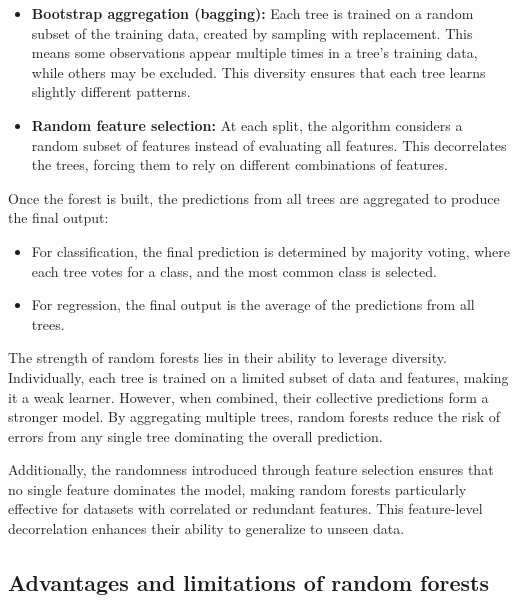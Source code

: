 \documentclass[
]{book}
\providecommand{\tightlist}{%
  \setlength{\itemsep}{0pt}\setlength{\parskip}{0pt}}
\theoremstyle{definition}
\theoremstyle{definition}
\theoremstyle{definition}
\theoremstyle{definition}
\theoremstyle{remark}
\begin{document}
\begin{itemize}
\tightlist
\item
  \textbf{Bootstrap aggregation (bagging):} Each tree is trained on a random subset of the training data, created by sampling with replacement. This means some observations appear multiple times in a tree's training data, while others may be excluded. This diversity ensures that each tree learns slightly different patterns.\\
\item
  \textbf{Random feature selection:} At each split, the algorithm considers a random subset of features instead of evaluating all features. This decorrelates the trees, forcing them to rely on different combinations of features.
\end{itemize}

Once the forest is built, the predictions from all trees are aggregated to produce the final output:

\begin{itemize}
\tightlist
\item
  For classification, the final prediction is determined by majority voting, where each tree votes for a class, and the most common class is selected.\\
\item
  For regression, the final output is the average of the predictions from all trees.
\end{itemize}

The strength of random forests lies in their ability to leverage diversity. Individually, each tree is trained on a limited subset of data and features, making it a weak learner. However, when combined, their collective predictions form a stronger model. By aggregating multiple trees, random forests reduce the risk of errors from any single tree dominating the overall prediction.

Additionally, the randomness introduced through feature selection ensures that no single feature dominates the model, making random forests particularly effective for datasets with correlated or redundant features. This feature-level decorrelation enhances their ability to generalize to unseen data.

\subsection*{Advantages and limitations of random forests}\label{advantages-and-limitations-of-random-forests}
\end{document}
